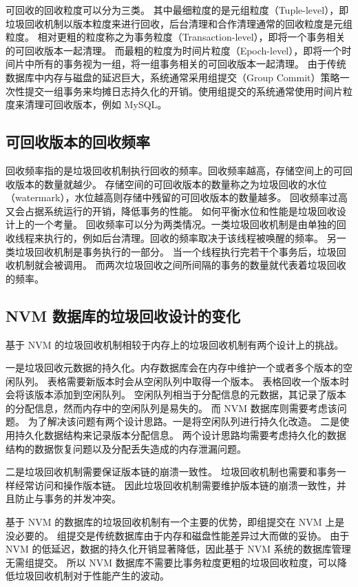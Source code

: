 可回收的回收粒度可以分为三类。
其中最细粒度的是元组粒度（Tuple-level），即垃圾回收机制以版本粒度来进行回收，后台清理和合作清理通常的回收粒度是元组粒度。
相对更粗的粒度称之为事务粒度（Transaction-level），即将一个事务相关的可回收版本一起清理。
而最粗的粒度为时间片粒度（Epoch-level），即将一个时间片中所有的事务视为一组，将一组事务相关的可回收版本一起清理。
由于传统数据库中内存与磁盘的延迟巨大，系统通常采用组提交（Group Commit）策略一次性提交一组事务来均摊日志持久化的开销。使用组提交的系统通常使用时间片粒度来清理可回收版本，例如 MySQL。

\subsection{可回收版本的回收频率}

回收频率指的是垃圾回收机制执行回收的频率。回收频率越高，存储空间上的可回收版本的数量就越少。
存储空间的可回收版本的数量称之为垃圾回收的水位（watermark），水位越高则存储中残留的可回收版本的数量越多。
回收频率过高又会占据系统运行的开销，降低事务的性能。
如何平衡水位和性能是垃圾回收设计上的一个考量。
回收频率可以分为两类情况。一类垃圾回收机制是由单独的回收线程来执行的，例如后台清理。回收的频率取决于该线程被唤醒的频率。
另一类垃圾回收机制是事务执行的一部分。
当一个线程执行完若干个事务后，垃圾回收机制就会被调用。
而两次垃圾回收之间所间隔的事务的数量就代表着垃圾回收的频率。


\subsection{NVM 数据库的垃圾回收设计的变化}

基于 NVM 的垃圾回收机制相较于内存上的垃圾回收机制有两个设计上的挑战。

一是垃圾回收元数据的持久化。内存数据库会在内存中维护一个或者多个版本的空闲队列。
表格需要新版本时会从空闲队列中取得一个版本。
表格回收一个版本时会将该版本添加到空闲队列。
空闲队列相当于分配信息的元数据，其记录了版本的分配信息，然而内存中的空闲队列是易失的。
而 NVM 数据库则需要考虑该问题。
为了解决该问题有两个设计思路。一是将空闲队列进行持久化改造。
二是使用持久化数据结构来记录版本分配信息。
两个设计思路均需要考虑持久化的数据结构的数据恢复问题以及分配丢失造成的内存泄漏问题。

二是垃圾回收机制需要保证版本链的崩溃一致性。
垃圾回收机制也需要和事务一样经常访问和操作版本链。
因此垃圾回收机制需要维护版本链的崩溃一致性，并且防止与事务的并发冲突。

基于 NVM 的数据库的垃圾回收机制有一个主要的优势，即组提交在 NVM 上是没必要的。
组提交是传统数据库由于内存和磁盘性能差异过大而做的妥协。
由于 NVM 的低延迟，数据的持久化开销显著降低，因此基于 NVM 系统的数据库管理无需组提交。
所以 NVM 数据库不需要比事务粒度更粗的垃圾回收粒度，可以降低垃圾回收机制对于性能产生的波动。


